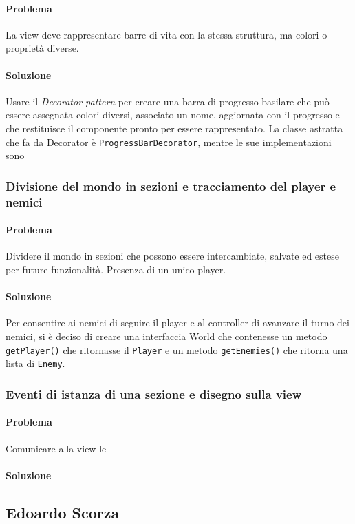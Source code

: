 \documentclass[a4paper,12pt]{report}
\begin{document}
\paragraph{Problema} La view deve rappresentare barre di vita con la stessa struttura, ma colori o proprietà diverse.
\paragraph{Soluzione} Usare il \textit{Decorator pattern} per creare una barra di progresso basilare che può essere assegnata colori diversi, associato un nome, aggiornata con il progresso e che restituisce il componente pronto per essere rappresentato. La classe astratta che fa da Decorator è \texttt{ProgressBarDecorator}, mentre le sue implementazioni sono 

\subsubsection*{Divisione del mondo in sezioni e tracciamento del player e nemici}
\paragraph{Problema} Dividere il mondo in sezioni che possono essere intercambiate, salvate ed estese per future funzionalità. Presenza di un unico player.
\paragraph{Soluzione} Per consentire ai nemici di seguire il player e al controller di avanzare il turno dei nemici, si è deciso di creare una interfaccia World che contenesse un metodo \texttt{getPlayer()} che ritornasse il \texttt{Player} e un metodo \texttt{getEnemies()} che ritorna una lista di \texttt{Enemy}.

\subsubsection*{Eventi di istanza di una sezione e disegno sulla view}
\paragraph{Problema} Comunicare alla view le 
\paragraph{Soluzione}

\subsection*{Edoardo Scorza}
\end{document}
